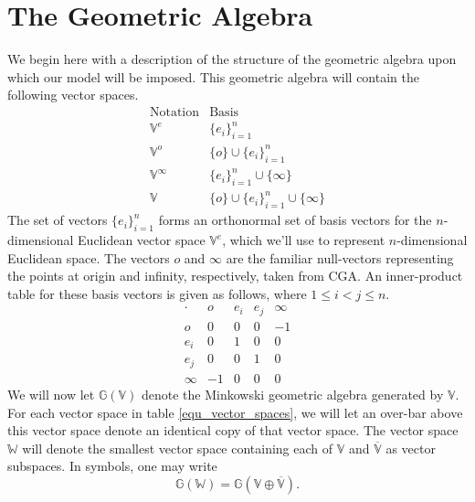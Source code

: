 \documentclass{birkjour}
\theoremstyle{definition}
\theoremstyle{remark}
\numberwithin{equation}{section}
\newcommand{\G}{\mathbb{G}}
\newcommand{\V}{\mathbb{V}}
\newcommand{\Vb}{\mathbb{\overline{V}}}
\newcommand{\W}{\mathbb{W}}
\newcommand{\nvao}{o}
\newcommand{\nvai}{\infty}
\begin{document}
\section{The Geometric Algebra}

We begin here with a description of the structure of the geometric algebra upon
which our model will be imposed.  This
geometric algebra will contain the following vector spaces.
\begin{equation}\label{equ_vector_spaces}
\begin{array}{ll}
\mbox{Notation} & \mbox{Basis} \\
\hline
\V^e & \{e_i\}_{i=1}^n \\
\V^{\nvao} & \{\nvao\}\cup\{e_i\}_{i=1}^n \\
\V^{\nvai} & \{e_i\}_{i=1}^n\cup\{\nvai\} \\
\V & \{\nvao\}\cup\{e_i\}_{i=1}^n\cup\{\nvai\}
\end{array}
\end{equation}
The set of vectors $\{e_i\}_{i=1}^n$ forms an orthonormal set of basis
vectors for the $n$-dimensional Euclidean vector space $\V^e$, which we'll
use to represent $n$-dimensional Euclidean space.
The vectors $\nvao$ and $\nvai$ are the familiar null-vectors representing the
points at origin and infinity, respectively, taken from CGA.
An inner-product table for these basis vectors is given as follows, where
$1\leq i<j\leq n$.
\begin{equation}\label{equ_basis_mul_table}
\begin{array}{c|cccc}
\cdot & \nvao & e_i & e_j & \nvai \\
\hline
\nvao & 0 & 0 & 0 & -1 \\
e_i & 0 & 1 & 0 & 0 \\
e_j & 0 & 0 & 1 & 0 \\
\nvai & -1 & 0 & 0 & 0
\end{array}
\end{equation}
We will now let $\G(\V)$ denote the Minkowski geometric algebra generated by $\V$.
For each vector space in table \eqref{equ_vector_spaces}, we will let an over-bar
above this vector space denote an identical copy of that vector space.  The vector
space $\W$ will denote the smallest vector space containing each of $\V$ and $\Vb$
as vector subspaces.  In symbols, one may write
\begin{equation}
\G(\W) = \G(\V\oplus\Vb).
\end{equation}
\end{document}
